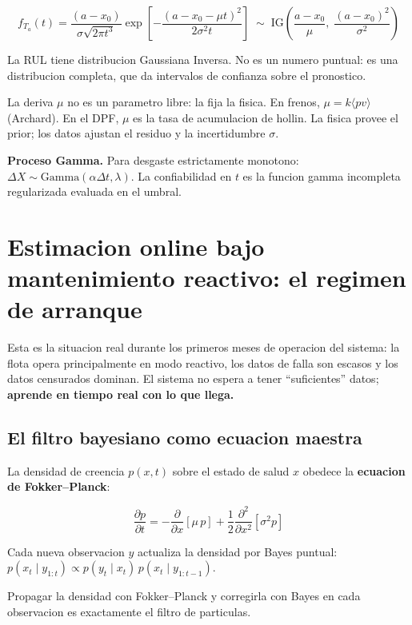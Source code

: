 \documentclass[10.5pt,a4paper]{article}
\begin{document}
\begin{mathbox}
$$f_{T_a}(t) = \frac{(a-x_0)}{\sigma\sqrt{2\pi t^3}}
  \exp\!\left[-\frac{(a-x_0-\mu t)^2}{2\sigma^2 t}\right]
  \;\sim\; \mathrm{IG}\!\left(\frac{a-x_0}{\mu},\;\frac{(a-x_0)^2}{\sigma^2}\right)$$

La RUL tiene distribucion Gaussiana Inversa. No es un numero puntual: es una
distribucion completa, que da intervalos de confianza sobre el pronostico.
\end{mathbox}

La deriva $\mu$ no es un parametro libre: la fija la fisica. En frenos,
$\mu = k\langle pv\rangle$ (Archard). En el DPF, $\mu$ es la tasa de acumulacion
de hollin. La fisica provee el prior; los datos ajustan el residuo y la
incertidumbre $\sigma$.

\textbf{Proceso Gamma.} Para desgaste estrictamente monotono: $\Delta X \sim
\mathrm{Gamma}(\alpha\Delta t,\lambda)$. La confiabilidad en $t$ es la funcion
gamma incompleta regularizada evaluada en el umbral.

\section{Estimacion online bajo mantenimiento reactivo: el regimen de arranque}

Esta es la situacion real durante los primeros meses de operacion del sistema:
la flota opera principalmente en modo reactivo, los datos de falla son escasos
y los datos censurados dominan. El sistema no espera a tener ``suficientes'' datos;
\textbf{aprende en tiempo real con lo que llega.}

\subsection{El filtro bayesiano como ecuacion maestra}

La densidad de creencia $p(x,t)$ sobre el estado de salud $x$ obedece la
\textbf{ecuacion de Fokker--Planck}:

\begin{mathbox}
$$\frac{\partial p}{\partial t} = -\frac{\partial}{\partial x}[\mu\,p]
  + \frac{1}{2}\frac{\partial^2}{\partial x^2}[\sigma^2 p]$$

Cada nueva observacion $y$ actualiza la densidad por Bayes puntual:
$p(x_t\mid y_{1:t}) \propto p(y_t\mid x_t)\,p(x_t\mid y_{1:t-1})$.

Propagar la densidad con Fokker--Planck y corregirla con Bayes en cada observacion
es exactamente el filtro de particulas.
\end{mathbox}
\end{document}

